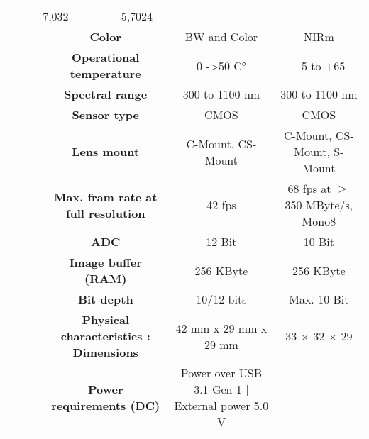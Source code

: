 \begin{table}[H]
{\begin{tabular}{ccc|cc|cc|}
  \multicolumn{2}{c|}{7,032} &
  \multicolumn{2}{c|}{5,7024} \\
\multicolumn{1}{|c|}{} &
  \multicolumn{2}{c|}{\cellcolor[HTML]{EFEFEF}\textbf{Color}} &
  \multicolumn{2}{c|}{\cellcolor[HTML]{EFEFEF}BW and Color} &
  \multicolumn{2}{c|}{\cellcolor[HTML]{EFEFEF}NIRm} \\
\multicolumn{1}{|c|}{} &
  \multicolumn{2}{c|}{\textbf{Operational temperature}} &
  \multicolumn{2}{c|}{0 -\textgreater 50 C°} &
  \multicolumn{2}{c|}{+5 to +65} \\
\multicolumn{1}{|c|}{} &
  \multicolumn{2}{c|}{\cellcolor[HTML]{EFEFEF}\textbf{Spectral range}} &
  \multicolumn{2}{c|}{\cellcolor[HTML]{EFEFEF}300 to 1100 nm} &
  \multicolumn{2}{c|}{\cellcolor[HTML]{EFEFEF}300 to 1100 nm} \\
\multicolumn{1}{|c|}{} &
  \multicolumn{2}{c|}{\textbf{Sensor type}} &
  \multicolumn{2}{c|}{CMOS} &
  \multicolumn{2}{c|}{CMOS} \\
\multicolumn{1}{|c|}{} &
  \multicolumn{2}{c|}{\cellcolor[HTML]{EFEFEF}\textbf{Lens mount}} &
  \multicolumn{2}{c|}{\cellcolor[HTML]{EFEFEF}C-Mount, CS-Mount} &
  \multicolumn{2}{c|}{\cellcolor[HTML]{EFEFEF}C-Mount, CS-Mount, S-Mount} \\
\multicolumn{1}{|c|}{} &
  \multicolumn{2}{c|}{\textbf{Max. fram rate at full resolution}} &
  \multicolumn{2}{c|}{42 fps} &
  \multicolumn{2}{c|}{68 fps at $\geq$350 MByte/s, Mono8} \\
\multicolumn{1}{|c|}{} &
  \multicolumn{2}{c|}{\cellcolor[HTML]{EFEFEF}\textbf{ADC}} &
  \multicolumn{2}{c|}{\cellcolor[HTML]{EFEFEF}12 Bit} &
  \multicolumn{2}{c|}{\cellcolor[HTML]{EFEFEF}10 Bit} \\
\multicolumn{1}{|c|}{} &
  \multicolumn{2}{c|}{\textbf{Image buffer (RAM)}} &
  \multicolumn{2}{c|}{256 KByte} &
  \multicolumn{2}{c|}{256 KByte} \\
\multicolumn{1}{|c|}{} &
  \multicolumn{2}{c|}{\cellcolor[HTML]{EFEFEF}\textbf{Bit depth}} &
  \multicolumn{2}{c|}{\cellcolor[HTML]{EFEFEF}10/12 bits} &
  \multicolumn{2}{c|}{\cellcolor[HTML]{EFEFEF}Max. 10 Bit} \\
\multicolumn{1}{|c|}{} &
  \multicolumn{2}{c|}{\textbf{Physical characteristics : Dimensions}} &
  \multicolumn{2}{c|}{42 mm x 29 mm x 29 mm} &
  \multicolumn{2}{c|}{33 × 32 × 29} \\
\multicolumn{1}{|c|}{} &
  \multicolumn{2}{c|}{\cellcolor[HTML]{EFEFEF}\textbf{Power requirements (DC)}} &
  \multicolumn{2}{c|}{\cellcolor[HTML]{EFEFEF}Power over USB 3.1 Gen 1 | External power 5.0 V} &

\end{tabular}}
\end{table}
